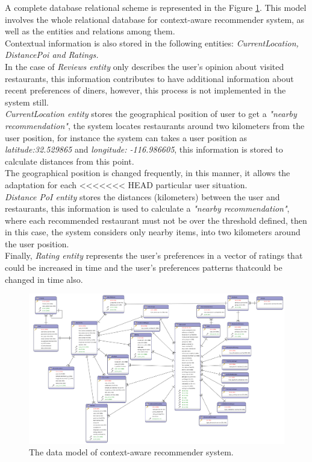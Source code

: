 A complete database relational scheme is represented in the 
Figure  \ref{fig:datamodel}. This model involves the whole relational 
database for context-aware recommender system, as well as 
the entities and relations among them. \\
Contextual information is also stored in the following entities:
\textit{CurrentLocation, DistancePoi and Ratings.} \\ 
In the case of \textit{Reviews entity}  only describes the user's 
opinion about visited restaurants, this information contributes to 
have additional information about recent preferences of diners, 
however, this process is not implemented in the system still. \\
\textit{CurrentLocation entity} stores the geographical position of
user to get a \textit{"nearby recommendation"}, the system locates
restaurants around two kilometers from the user position, for instance
the system can takes a user position as \textit{latitude:32.529865}
and \textit{longitude: -116.986605}, this information is stored to
calculate distances from this point. \\ The geographical position is
changed frequently, in this manner, it allows the adaptation for each
<<<<<<< HEAD
particular user situation. \\ \textit{Distance PoI entity} stores the
distances (kilometers) between the user and restaurants, this
information is used to calculate a \textit{"nearby recommendation"},
where each recommended restaurant must not be over the threshold defined, 
then in this case, the system considers only nearby items, into two kilometers 
around the user position.\\
Finally, \textit{Rating entity} represents the user's preferences  
in a vector of ratings that could be increased in time and  
the user's preferences patterns thatcould be changed in time also.
\begin{landscape} 
\begin{figure}[!h] 
\captionsetup{font=footnotesize}
\centering
\includegraphics[width=1.3\textwidth]{img/recomet.png}
\caption{The data model of context-aware recommender system.}
\label{fig:datamodel}    
\end{figure}
\end{landscape}

